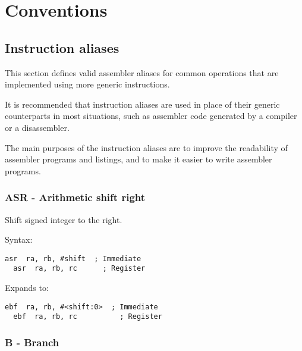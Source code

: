 %

\chapter{Conventions}

\section{Instruction aliases}

This section defines valid assembler aliases for common operations that are
implemented using more generic instructions.

It is recommended that instruction aliases are used in place of their generic
counterparts in most situations, such as assembler code generated by a compiler
or a disassembler.

The main purposes of the instruction aliases are to improve the readability of
assembler programs and listings, and to make it easier to write assembler
programs.

\subsection{ASR - Arithmetic shift right}

Shift signed integer to the right.

Syntax:
\begin{lstlisting}[style=assembler]
  asr  ra, rb, #shift  ; Immediate
  asr  ra, rb, rc      ; Register
\end{lstlisting}

Expands to:
\begin{lstlisting}[style=assembler]
  ebf  ra, rb, #<shift:0>  ; Immediate
  ebf  ra, rb, rc          ; Register
\end{lstlisting}

\subsection{B - Branch}

